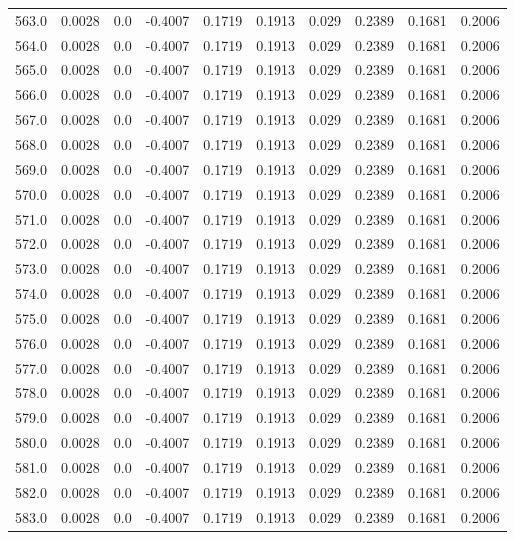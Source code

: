 \begin{longtable}{lrrrrrrrrr}
563.0 & 0.0028 & 0.0 & -0.4007 & 0.1719 & 0.1913 & 0.029 & 0.2389 & 0.1681 & 0.2006 \\
564.0 & 0.0028 & 0.0 & -0.4007 & 0.1719 & 0.1913 & 0.029 & 0.2389 & 0.1681 & 0.2006 \\
565.0 & 0.0028 & 0.0 & -0.4007 & 0.1719 & 0.1913 & 0.029 & 0.2389 & 0.1681 & 0.2006 \\
566.0 & 0.0028 & 0.0 & -0.4007 & 0.1719 & 0.1913 & 0.029 & 0.2389 & 0.1681 & 0.2006 \\
567.0 & 0.0028 & 0.0 & -0.4007 & 0.1719 & 0.1913 & 0.029 & 0.2389 & 0.1681 & 0.2006 \\
568.0 & 0.0028 & 0.0 & -0.4007 & 0.1719 & 0.1913 & 0.029 & 0.2389 & 0.1681 & 0.2006 \\
569.0 & 0.0028 & 0.0 & -0.4007 & 0.1719 & 0.1913 & 0.029 & 0.2389 & 0.1681 & 0.2006 \\
570.0 & 0.0028 & 0.0 & -0.4007 & 0.1719 & 0.1913 & 0.029 & 0.2389 & 0.1681 & 0.2006 \\
571.0 & 0.0028 & 0.0 & -0.4007 & 0.1719 & 0.1913 & 0.029 & 0.2389 & 0.1681 & 0.2006 \\
572.0 & 0.0028 & 0.0 & -0.4007 & 0.1719 & 0.1913 & 0.029 & 0.2389 & 0.1681 & 0.2006 \\
573.0 & 0.0028 & 0.0 & -0.4007 & 0.1719 & 0.1913 & 0.029 & 0.2389 & 0.1681 & 0.2006 \\
574.0 & 0.0028 & 0.0 & -0.4007 & 0.1719 & 0.1913 & 0.029 & 0.2389 & 0.1681 & 0.2006 \\
575.0 & 0.0028 & 0.0 & -0.4007 & 0.1719 & 0.1913 & 0.029 & 0.2389 & 0.1681 & 0.2006 \\
576.0 & 0.0028 & 0.0 & -0.4007 & 0.1719 & 0.1913 & 0.029 & 0.2389 & 0.1681 & 0.2006 \\
577.0 & 0.0028 & 0.0 & -0.4007 & 0.1719 & 0.1913 & 0.029 & 0.2389 & 0.1681 & 0.2006 \\
578.0 & 0.0028 & 0.0 & -0.4007 & 0.1719 & 0.1913 & 0.029 & 0.2389 & 0.1681 & 0.2006 \\
579.0 & 0.0028 & 0.0 & -0.4007 & 0.1719 & 0.1913 & 0.029 & 0.2389 & 0.1681 & 0.2006 \\
580.0 & 0.0028 & 0.0 & -0.4007 & 0.1719 & 0.1913 & 0.029 & 0.2389 & 0.1681 & 0.2006 \\
581.0 & 0.0028 & 0.0 & -0.4007 & 0.1719 & 0.1913 & 0.029 & 0.2389 & 0.1681 & 0.2006 \\
582.0 & 0.0028 & 0.0 & -0.4007 & 0.1719 & 0.1913 & 0.029 & 0.2389 & 0.1681 & 0.2006 \\
583.0 & 0.0028 & 0.0 & -0.4007 & 0.1719 & 0.1913 & 0.029 & 0.2389 & 0.1681 & 0.2006 \\

\end{longtable}
